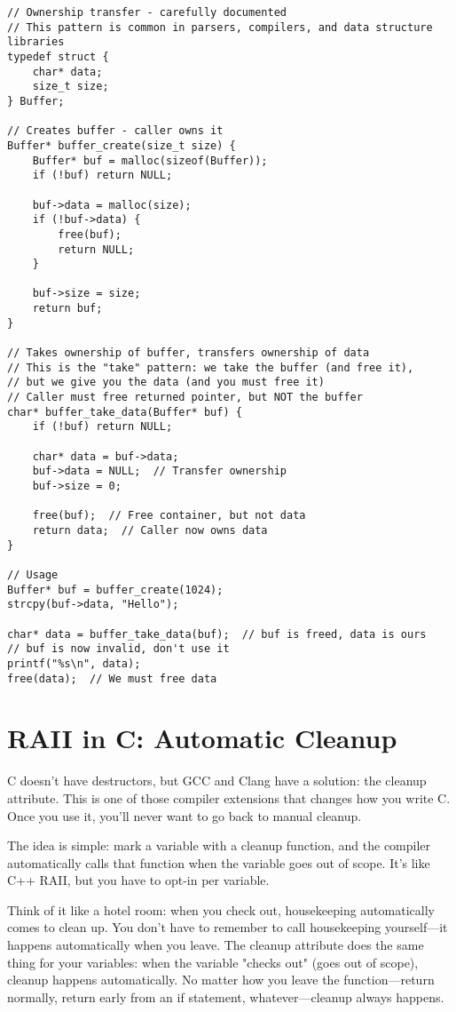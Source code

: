 \begin{lstlisting}
// Ownership transfer - carefully documented
// This pattern is common in parsers, compilers, and data structure libraries
typedef struct {
    char* data;
    size_t size;
} Buffer;

// Creates buffer - caller owns it
Buffer* buffer_create(size_t size) {
    Buffer* buf = malloc(sizeof(Buffer));
    if (!buf) return NULL;

    buf->data = malloc(size);
    if (!buf->data) {
        free(buf);
        return NULL;
    }

    buf->size = size;
    return buf;
}

// Takes ownership of buffer, transfers ownership of data
// This is the "take" pattern: we take the buffer (and free it),
// but we give you the data (and you must free it)
// Caller must free returned pointer, but NOT the buffer
char* buffer_take_data(Buffer* buf) {
    if (!buf) return NULL;

    char* data = buf->data;
    buf->data = NULL;  // Transfer ownership
    buf->size = 0;

    free(buf);  // Free container, but not data
    return data;  // Caller now owns data
}

// Usage
Buffer* buf = buffer_create(1024);
strcpy(buf->data, "Hello");

char* data = buffer_take_data(buf);  // buf is freed, data is ours
// buf is now invalid, don't use it
printf("%s\n", data);
free(data);  // We must free data
\end{lstlisting}

\section{RAII in C: Automatic Cleanup}

C doesn't have destructors, but GCC and Clang have a solution: the cleanup attribute. This is one of those compiler extensions that changes how you write C. Once you use it, you'll never want to go back to manual cleanup.

The idea is simple: mark a variable with a cleanup function, and the compiler automatically calls that function when the variable goes out of scope. It's like C++ RAII, but you have to opt-in per variable.

Think of it like a hotel room: when you check out, housekeeping automatically comes to clean up. You don't have to remember to call housekeeping yourself—it happens automatically when you leave. The cleanup attribute does the same thing for your variables: when the variable "checks out" (goes out of scope), cleanup happens automatically. No matter how you leave the function—return normally, return early from an if statement, whatever—cleanup always happens.

